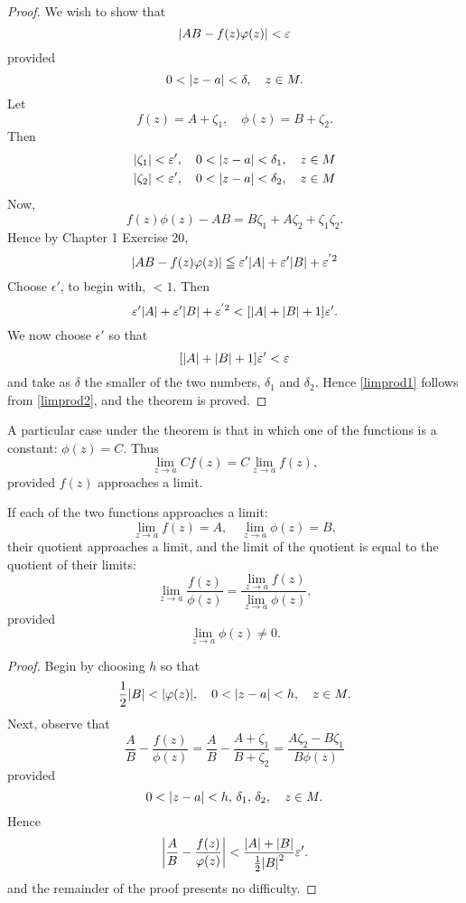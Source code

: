 \documentclass[twosided]{memoir}
\begin{document}
\begin{proof}
We wish to show that
\begin{equation}\label{limprod1}
	\abs*{AB-f(z)\phi (z)} <\epsilon
\end{equation}
provided
\[
0<\abs*{z-a} <\delta , \quad z \in M
.\] Let
\[
	f(z)=A+\zeta_1, \quad \phi (z)=B+\zeta_2
.\] Then
\begin{align*}
\abs*{\zeta_1} <\epsilon', \quad 0<\abs*{z-a} <\delta_1, \quad z \in M\\
\abs*{\zeta_2} <\epsilon', \quad 0<\abs*{z-a} <\delta_2, \quad z \in M
\end{align*} Now,
\[
	f(z)\phi (z)-AB=B\zeta_1+A\zeta_2+\zeta_1\zeta_2
.\] Hence by Chapter 1 Exercise 20,
\begin{equation}\label{limprod2}
	\abs*{AB-f(z)\phi (z)} \le \epsilon'\abs*{A} +\epsilon'\abs*{B} +\epsilon^{'2}
\end{equation} Choose $\epsilon'$, to begin with, $<1$. Then
\[
\epsilon'\abs*{A} +\epsilon'\abs*{B} +\epsilon^{'2}< \sbr*{\abs*{A} +\abs*{B} +1} \epsilon'
.\] We now choose $\epsilon'$ so that
\[
\sbr*{\abs*{A} +\abs*{B} +1} \epsilon'<\epsilon
\] and take as $\delta $ the smaller of the two numbers, $\delta_1$ and $\delta_2$. Hence \ref{limprod1} follows from \ref{limprod2}, and the theorem is proved.
\end{proof} 

A particular case under the theorem is that in which one of the functions is a constant: $\phi (z)=C$. Thus
\[
	\lim\limits_{z \to a} Cf(z)=C \lim\limits_{z \to a} f(z)
,\] provided $f(z)$ approaches a limit.

\begin{theorem}
If each of the two functions approaches a limit:
\[
	\lim\limits_{z \to a} f(z)=A, \quad \lim\limits_{z \to a} \phi (z)=B
,\] their quotient approaches a limit, and the limit of the quotient is equal to the quotient of their limits:
\[
	\lim\limits_{z \to a} \frac{f(z)}{\phi (z)} =\frac{\lim\limits_{z\to a} f(z)}{\lim\limits_{z\to a} \phi (z)} 
,\] provided 
\[
	\lim\limits_{z\to a} \phi (z)\neq 0
.\] 
\end{theorem} 
\begin{proof}
Begin by choosing $h$ so that
\[
	\frac{1}{2}\abs*{B} <\abs*{\phi (z)} , \quad 0<\abs*{z-a} <h, \quad z \in M
.\] Next, observe that
\[
	\frac{A}{B}-\frac{f(z)}{\phi (z)} =\frac{A}{B}-\frac{A+\zeta_1}{B+\zeta_2} =\frac{A\zeta_2-B\zeta_1}{B\phi (z)} 
\] provided
\[
0<\abs*{z-a} <h,\, \delta_1, \, \delta_2, \quad z \in M
.\] Hence
\begin{equation}\label{limquo1}
	\abs*{\frac{A}{B}-\frac{f(z)}{\phi (z)} } <\frac{\abs*{A} +\abs*{B} }{\frac{1}{2}\abs*{B} ^2} \epsilon'.
\end{equation} and the remainder of the proof presents no difficulty.
\end{proof} 
\end{document}
